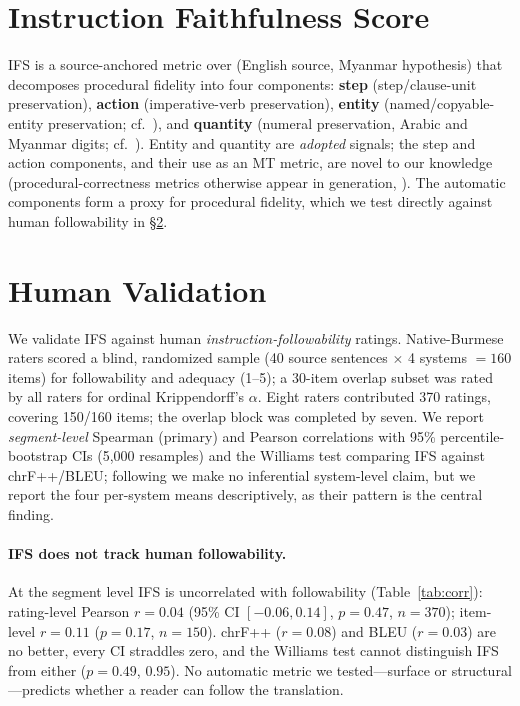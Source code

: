 \documentclass[11pt]{article}
\begin{document}


\section{Instruction Faithfulness Score}\label{sec:ifs}
IFS is a source-anchored metric over (English source, Myanmar hypothesis) that decomposes
procedural fidelity into four components: \textbf{step} (step/clause-unit preservation),
\textbf{action} (imperative-verb preservation), \textbf{entity} (named/copyable-entity
preservation; cf.\ \citealp{meta2024,wmtced2022}), and \textbf{quantity} (numeral
preservation, Arabic and Myanmar digits; cf.\ \citealp{wmtced2022}). Entity and quantity are
\emph{adopted} signals; the step and action components, and their use as an MT metric, are
novel to our knowledge (procedural-correctness metrics otherwise appear in generation,
\citealp{recipegen2025}). The automatic components form a proxy for procedural fidelity, which we
test directly against human followability in \S\ref{sec:human}.


\section{Human Validation}\label{sec:human}
We validate IFS against human \emph{instruction-followability} ratings. Native-Burmese raters
scored a blind, randomized sample (40 source sentences $\times$ 4 systems $=160$ items) for
followability and adequacy (1--5); a 30-item overlap subset was rated by all raters for
ordinal Krippendorff's $\alpha$. Eight raters contributed 370 ratings, covering 150/160 items;
the overlap block was completed by seven. We report \emph{segment-level} Spearman (primary) and
Pearson correlations with 95\% percentile-bootstrap CIs (5{,}000 resamples) and the Williams
test \citep{graham2014williams} comparing IFS against chrF++/BLEU; following
\citet{mathur2020tangled,kocmi2021ship} we make no inferential system-level claim, but we report
the four per-system means descriptively, as their pattern is the central finding.

\paragraph{IFS does not track human followability.} At the segment level IFS is uncorrelated
with followability (Table~\ref{tab:corr}): rating-level Pearson $r{=}0.04$ (95\% CI
$[-0.06, 0.14]$, $p{=}0.47$, $n{=}370$); item-level $r{=}0.11$ ($p{=}0.17$, $n{=}150$). chrF++
($r{=}0.08$) and BLEU ($r{=}0.03$) are no better, every CI straddles zero, and the Williams test
cannot distinguish IFS from either ($p{=}0.49$, $0.95$). No automatic metric we tested---surface
or structural---predicts whether a reader can follow the translation.
\end{document}
